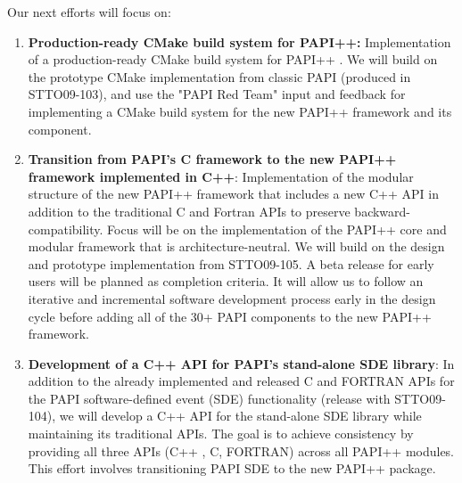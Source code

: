 Our next efforts will focus on:
\begin{enumerate}
\item \textbf{Production-ready CMake build system for PAPI++:} 
		Implementation of a production-ready CMake build system for PAPI++ .  
		We will build on the prototype CMake implementation from classic PAPI (produced in STTO09-103), 
		and use the "PAPI Red Team" input and feedback for implementing a CMake build system for the new 
		PAPI++ framework and its component.
%
\item \textbf{Transition from PAPI's C framework to the new PAPI++ framework implemented in C++}: 
		Implementation of the modular structure of the new PAPI++ framework that includes a new 
		C++ API in addition to the traditional C and Fortran APIs to preserve backward-compatibility. 
		Focus will be on the implementation of the PAPI++ core and modular framework that is 
		architecture-neutral. We will build on the design and prototype implementation from STTO09-105. 
		A beta release for early users will be planned as completion criteria. It will allow us to follow an 
		iterative and incremental software development process early in the design cycle before 
		adding all of the 30+ PAPI components to the new PAPI++ framework.
%
\item \textbf{Development of a C++ API for PAPI's stand-alone SDE library}:
		In addition to the already implemented and released C and FORTRAN APIs for the PAPI 
		software-defined event (SDE) functionality (release with STTO09-104), we will develop a 
		C++ API for the stand-alone SDE library while maintaining its traditional APIs. The goal is 
		to achieve consistency by providing all three APIs (C++ , C, FORTRAN) across all PAPI++ 
		modules. This effort involves transitioning PAPI SDE to the new PAPI++ package.
%
\end{enumerate}
